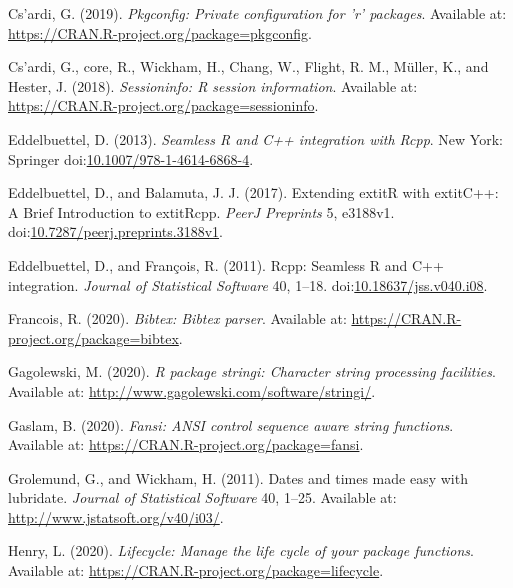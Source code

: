 \documentclass[utf8]{frontiersSCNS}
\begin{document}
\leavevmode\hypertarget{ref-csrdi2019pkgconfig}{}%
Cs\a'ardi, G. (2019). \emph{Pkgconfig: Private configuration for 'r'
packages}. Available at:
\url{https://CRAN.R-project.org/package=pkgconfig}.

\leavevmode\hypertarget{ref-csrdi2018sessioninfo}{}%
Cs\a'ardi, G., core, R., Wickham, H., Chang, W., Flight, R. M., Müller,
K., and Hester, J. (2018). \emph{Sessioninfo: R session information}.
Available at: \url{https://CRAN.R-project.org/package=sessioninfo}.

\leavevmode\hypertarget{ref-eddelbuettel2013seamless}{}%
Eddelbuettel, D. (2013). \emph{Seamless R and C++ integration with
Rcpp}. New York: Springer
doi:\href{https://doi.org/10.1007/978-1-4614-6868-4}{10.1007/978-1-4614-6868-4}.

\leavevmode\hypertarget{ref-eddelbuettel2017extending}{}%
Eddelbuettel, D., and Balamuta, J. J. (2017). Extending extitR with
extitC++: A Brief Introduction to extitRcpp. \emph{PeerJ Preprints} 5,
e3188v1.
doi:\href{https://doi.org/10.7287/peerj.preprints.3188v1}{10.7287/peerj.preprints.3188v1}.

\leavevmode\hypertarget{ref-eddelbuettel2011rcpp}{}%
Eddelbuettel, D., and François, R. (2011). Rcpp: Seamless R and C++
integration. \emph{Journal of Statistical Software} 40, 1--18.
doi:\href{https://doi.org/10.18637/jss.v040.i08}{10.18637/jss.v040.i08}.

\leavevmode\hypertarget{ref-francois2020bibtex}{}%
Francois, R. (2020). \emph{Bibtex: Bibtex parser}. Available at:
\url{https://CRAN.R-project.org/package=bibtex}.

\leavevmode\hypertarget{ref-gagolewski2020package}{}%
Gagolewski, M. (2020). \emph{R package stringi: Character string
processing facilities}. Available at:
\url{http://www.gagolewski.com/software/stringi/}.

\leavevmode\hypertarget{ref-gaslam2020fansi}{}%
Gaslam, B. (2020). \emph{Fansi: ANSI control sequence aware string
functions}. Available at:
\url{https://CRAN.R-project.org/package=fansi}.

\leavevmode\hypertarget{ref-grolemund2011dates}{}%
Grolemund, G., and Wickham, H. (2011). Dates and times made easy with
lubridate. \emph{Journal of Statistical Software} 40, 1--25. Available
at: \url{http://www.jstatsoft.org/v40/i03/}.

\leavevmode\hypertarget{ref-henry2020lifecycle}{}%
Henry, L. (2020). \emph{Lifecycle: Manage the life cycle of your package
functions}. Available at:
\url{https://CRAN.R-project.org/package=lifecycle}.
\end{document}
